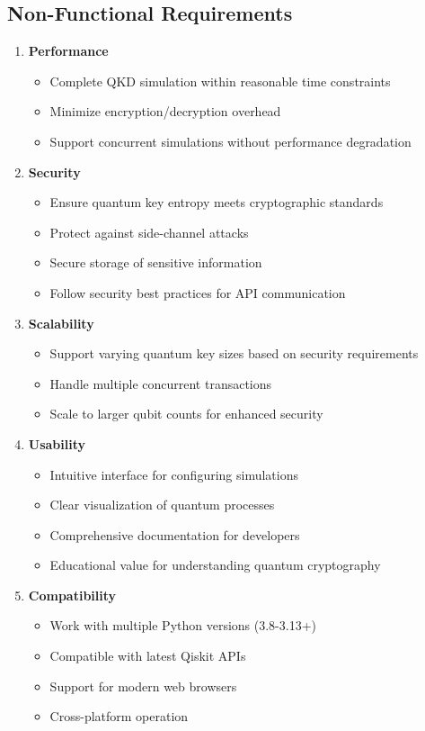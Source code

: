 \documentclass[onecolumn,a4paper,10pt]{IEEEtran}
\begin{document}
\subsection{Non-Functional Requirements}
\begin{enumerate}
    \item \textbf{Performance}
    \begin{itemize}
        \item Complete QKD simulation within reasonable time constraints
        \item Minimize encryption/decryption overhead
        \item Support concurrent simulations without performance degradation
    \end{itemize}
    
    \item \textbf{Security}
    \begin{itemize}
        \item Ensure quantum key entropy meets cryptographic standards
        \item Protect against side-channel attacks
        \item Secure storage of sensitive information
        \item Follow security best practices for API communication
    \end{itemize}
    
    \item \textbf{Scalability}
    \begin{itemize}
        \item Support varying quantum key sizes based on security requirements
        \item Handle multiple concurrent transactions
        \item Scale to larger qubit counts for enhanced security
    \end{itemize}
    
    \item \textbf{Usability}
    \begin{itemize}
        \item Intuitive interface for configuring simulations
        \item Clear visualization of quantum processes
        \item Comprehensive documentation for developers
        \item Educational value for understanding quantum cryptography
    \end{itemize}
    
    \item \textbf{Compatibility}
    \begin{itemize}
        \item Work with multiple Python versions (3.8-3.13+)
        \item Compatible with latest Qiskit APIs
        \item Support for modern web browsers
        \item Cross-platform operation
    \end{itemize}
\end{enumerate}
\end{document}
